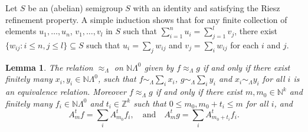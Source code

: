 \documentclass[a4paper, 12pt]{amsart}
\numberwithin{equation}{section}
\newcounter{theorem}
\newtheorem{lemma}[theorem]{Lemma}
\theoremstyle{remark}
\theoremstyle{definition}
\begin{document}
Let $S$ be an (abelian) semigroup $S$ with an identity and satisfying the Riesz
refinement property. A simple induction shows that for any finite collection of elements $u_1, \dots, u_n$, $v_1, \dots,
v_l$ in $S$ such that $\sum_{i=1}^nu_i=\sum_{j=1}^lv_j$, there exist $\{w_{ij}: i\leq n, j\leq l\}\subseteq S$ such
that $u_i=\sum_jw_{ij}$ and $v_j=\sum_iw_{ij}$ for each $i$ and $j$.

\begin{lemma}\label{lem.relation.two}
The relation $\approx_{\Lambda}$ on ${\mathbb{N}}\Lambda^0$ given by $f\approx_{\Lambda}g$ if and
only if there exist finitely many $x_i,y_i\in {\mathbb{N}} \Lambda^0$, such that
$f\sim_{\Lambda}\sum_i x_i$, $g\sim_{\Lambda}\sum_i y_i$ and $x_i\sim_{\Lambda} y_i$ for
all $i$ is an equivalence relation. Moreover $f\approx_{\Lambda}g$ if and only if there
exist $m,m_0\in {\mathbb{N}}^k$ and finitely many $f_i\in  {\mathbb{N}} \Lambda^0$ and $t_i\in {\mathbb{Z}}^k$ such
that $0\leq m_0,m_0+t_i\leq m$ for all $i$, and
$$A^t_mf=\sum_iA^t_{m_0}f_i, \quad\text{and}\quad A^t_mg=\sum_i A^t_{m_0+t_i}f_i.$$
\end{lemma}
\end{document}
